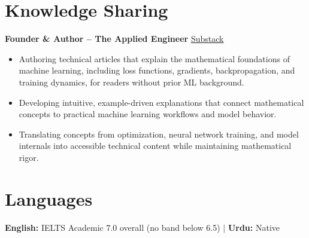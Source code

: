 \documentclass[10.5pt,a4paper]{article}
\begin{document}
\section*{Knowledge Sharing}

\noindent\textbf{Founder \& Author -- The Applied Engineer}
\hfill
\href{https://theappliedengineer.substack.com/}{\underline{Substack}}

\begin{itemize}
    \item Authoring technical articles that explain the mathematical foundations of machine learning, including loss functions, gradients, backpropagation, and training dynamics, for readers without prior ML background.
    \item Developing intuitive, example-driven explanations that connect mathematical concepts to practical machine learning workflows and model behavior.
    \item Translating concepts from optimization, neural network training, and model internals into accessible technical content while maintaining mathematical rigor.
\end{itemize}


\section*{Languages}

\noindent\textbf{English:} IELTS Academic 7.0 overall (no band below 6.5)
\quad $\vert$ \quad
\noindent\textbf{Urdu:} Native
\end{document}
